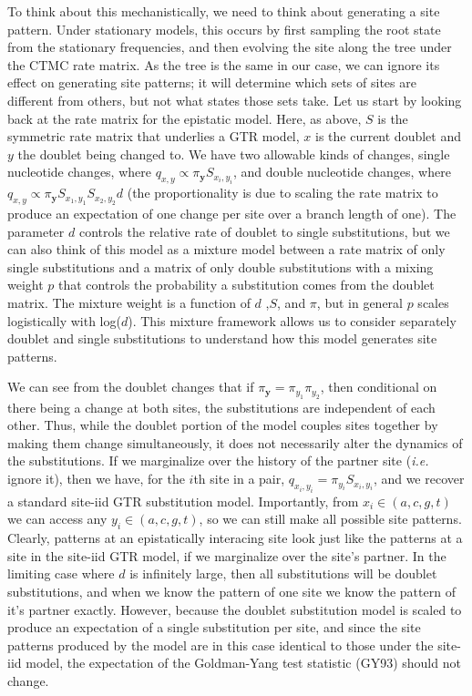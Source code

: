 \documentclass[11pt]{article}
\begin{document}
To think about this mechanistically, we need to think about generating a site pattern.
Under stationary models, this occurs by first sampling the root state from the stationary frequencies, and then evolving the site along the tree under the CTMC rate matrix.
As the tree is the same in our case, we can ignore its effect on generating site patterns; it will determine which sets of sites are different from others, but not what states those sets take.
Let us start by looking back at the rate matrix for the epistatic model.
Here, as above, $S$ is the symmetric rate matrix that underlies a GTR model, $x$ is the current doublet and $y$ the doublet being changed to.
We have two allowable kinds of changes, single nucleotide changes, where $q_{x,y} \propto \pi_{\boldsymbol{y}} S_{x_i, y_i}$, and double nucleotide changes, where $q_{x,y} \propto \pi_{\boldsymbol{y}} S_{x_1, y_1} S_{x_2, y_2} d$ (the proportionality is due to scaling the rate matrix to produce an expectation of one change per site over a branch length of one).
The parameter $d$ controls the relative rate of doublet to single substitutions, but we can also think of this model as a mixture model between a rate matrix of only single substitutions and a matrix of only double substitutions with a mixing weight $p$ that controls the probability a substitution comes from the doublet matrix.
The mixture weight is a function of $d$ ,$S$, and $\pi$, but in general $p$ scales logistically with log($d$).
This mixture framework allows us to consider separately doublet and single substitutions to understand how this model generates site patterns.

We can see from the doublet changes that if $\pi_{\boldsymbol{y}} = \pi_{y_1} \pi_{y_2}$, then conditional on there being a change at both sites, the substitutions are independent of each other.
Thus, while the doublet portion of the model couples sites together by making them change simultaneously, it does not necessarily alter the dynamics of the substitutions.
If we marginalize over the history of the partner site (\textit{i.e.} ignore it), then we have, for the $i$th site in a pair, $q_{x_i,y_i} = \pi_{y_i} S_{x_i, y_i}$, and we recover a standard site-iid GTR substitution model.
Importantly, from $x_i \in (a,c,g,t)$ we can access any $y_i \in (a,c,g,t)$, so we can still make all possible site patterns.
Clearly, patterns at an epistatically interacing site look just like the patterns at a site in the site-iid GTR model, if we marginalize over the site's partner.
In the limiting case where $d$ is infinitely large, then all substitutions will be doublet substitutions, and when we know the pattern of one site we know the pattern of it's partner exactly.
However, because the doublet substitution model is scaled to produce an expectation of a single substitution per site, and since the site patterns produced by the model are in this case identical to those under the site-iid model, the expectation of the Goldman-Yang test statistic (GY93) should not change.
\end{document}

